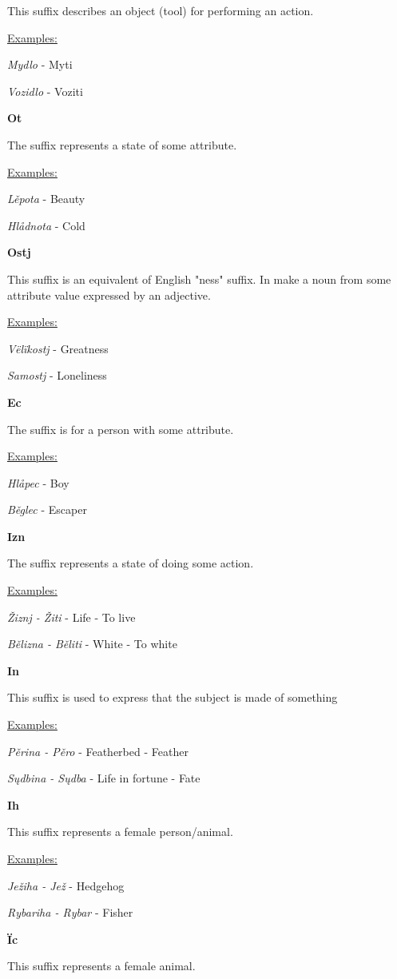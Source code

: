This suffix describes an object (tool) for performing an action.

\underline{Examples:}

\textit{Mydlo} - Myti

\textit{Vozidlo} - Voziti

\textbf{Ot}

The suffix represents a state of some attribute.

\underline{Examples:}

\textit{Lěpota} - Beauty

\textit{Hlådnota} - Cold

\textbf{Ostj}

This suffix is an equivalent of English "ness" suffix. In make a noun from some attribute value expressed by an adjective.

\underline{Examples:}

\textit{Vëlïkostj} - Greatness

\textit{Samostj} - Loneliness

\textbf{Ec}

The suffix is for a person with some attribute.

\underline{Examples:}

\textit{Hlåpec} - Boy

\textit{Běglec} - Escaper

\textbf{Izn}

The suffix represents a state of doing some action.

\underline{Examples:}

\textit{Žiznj - Žiti} - Life - To live

\textit{Bělizna - Běliti} - White - To white

\textbf{In}

This suffix is used to express that the subject is made of something

\underline{Examples:}

\textit{Pěrina - Pěro} - Featherbed - Feather

\textit{Sųdbina - Sųdba} - Life in fortune - Fate

\textbf{Ih}

This suffix represents a female person/animal.

\underline{Examples:}

\textit{Ježiha - Jež} - Hedgehog

\textit{Rybariha - Rybar} - Fisher

\textbf{Ïc}

This suffix represents a female animal.

